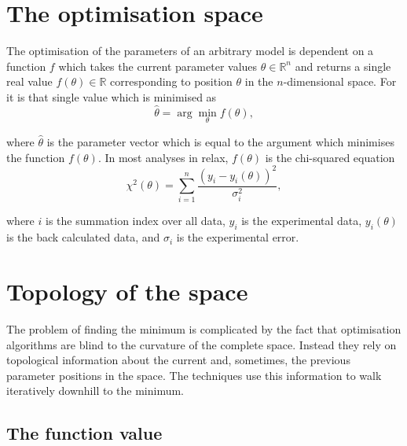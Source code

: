 
\section{The optimisation space}

The optimisation of the parameters of an arbitrary model is dependent on a function $f$ which takes the current parameter values $\theta \in \mathbb{R}^n$ and returns a single real value $f(\theta) \in \mathbb{R}$ corresponding to position $\theta$ in the $n$-dimensional space.
For it is that single value which is minimised as
\begin{equation}
 \hat\theta = \arg \min_\theta f(\theta),
\end{equation}

\noindent where $\hat\theta$ is the parameter vector which is equal to the argument which minimises the function $f(\theta)$.
In most analyses in relax, $f(\theta)$ is the chi-squared equation
\begin{equation} \label{eq: chi2}
 \chi^2(\theta) = \sum_{i=1}^n \frac{(y_i - y_i(\theta))^2}{\sigma_i^2},
\end{equation}

\noindent where $i$ is the summation index over all data, $y_i$ is the experimental data, $y_i(\theta)$ is the back calculated data, and $\sigma_i$ is the experimental error.




\section{Topology of the space}

The problem of finding the minimum is complicated by the fact that optimisation algorithms are blind to the curvature of the complete space.
Instead they rely on topological information about the current and, sometimes, the previous parameter positions in the space.
The techniques use this information to walk iteratively downhill to the minimum.




\subsection{The function value}

